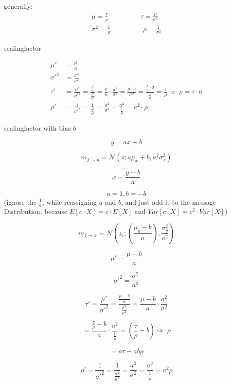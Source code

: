 \documentclass{article}
\begin{document}
generally:\\
\begin{align}
\mu = \frac{\tau}{\rho} \hspace{2cm}    \tau = \frac{\mu}{\sigma^2}\\[1em]
\sigma^2 = \frac{1}{\rho} \hspace{2cm} \rho = \frac{1}{\sigma^2}
\end{align}

scalingfactor

\begin{align*}
\mu' &= \frac{\mu}{a} \\
\sigma'^2 &= \frac{\sigma^2}{a^2} \\[1em]
\tau' &= \frac{\mu'}{\sigma'^2} = \frac{\frac{\mu}{a}}{\frac{\sigma^2}{a^2}} = \frac{\mu}{a} \cdot \frac{a^2}{\sigma^2} = \frac{\mu \cdot a}{\sigma^2} = \frac{\frac{\tau}{\rho} \cdot a}{\frac{1}{\rho}} = \frac{\tau}{\rho} \cdot a \cdot \rho = \tau \cdot a \\[1em]
\rho' &= \frac{1}{\sigma'^2} = \frac{1}{\frac{\sigma^2}{a^2}} = \frac{a^2}{\sigma^2} = \frac{a^2}{\frac{1}{\rho}} = a^2 \cdot \rho
\end{align*}

scalingfactor with bias $b$




\[
y = ax + b
\]

\[
m_{f \rightarrow y} = \mathcal{N}(z; a\mu_x + b, a^2 \sigma_x^2)
\]
\hrulefill

\[
x = \frac{y - b}{a}
\]

\[
a = 1, b = -{b}
\] (ignore the $\frac{1}{a}$, while reassigning $a$ and $b$, and just add it to the message Distribution, because $E[c \cdot X] = c \cdot E[X]$ and $Var[c \cdot X] = c^2 \cdot Var[X]$)


\[
m_{f \rightarrow x} = \mathcal{N} \left(z_i; \left(\frac{\mu_y - b}{a}\right), \frac{\sigma_y^2}{a^2} \right)
\]

\[
\mu' = \frac{\mu - b}{a}
\]

\[
\sigma'^2 = \frac{\sigma^2}{a^2}
\]

\[
\tau' = \frac{\mu'}{\sigma'^2} = \frac{\frac{\mu - b}{a}}{\frac{\sigma^2}{a^2}} = \frac{\mu - b}{a} \cdot \frac{a^2}{\sigma^2}
\]

\[
    = \frac{\frac{\tau}{\rho} - b}{a} \cdot \frac{a^2}{\frac{1}{\rho}} = (\frac{\tau}{\rho} - b)\cdot a\cdot \rho 
\]

\[
    = a \tau - ab\rho
\]


\[
\rho' = \frac{1}{\sigma'^2} = \frac{1}{\frac{\sigma^2}{a^2}} = \frac{a^2}{\sigma^2} = \frac{a^2}{\frac{1}{\rho}} = a^2 \rho
\]
\end{document}

